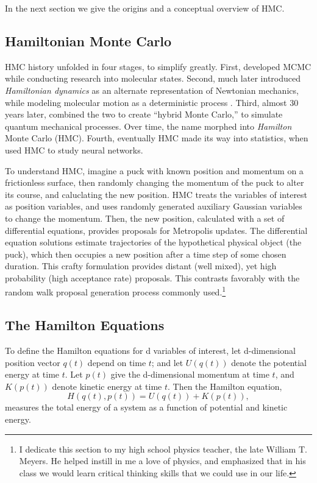 In the next section we give the origins and a conceptual overview of HMC.

\subsection{Hamiltonian Monte Carlo} 

HMC history unfolded in four stages, to simplify greatly. First, \cite{Metropolis1953} developed MCMC while conducting research into molecular states. Second, much later \cite{Alder1959} introduced {\it Hamiltonian dynamics} as an alternate representation of Newtonian mechanics, while modeling molecular motion as a deterministic process \citep{Newt}. Third, almost 30 years later, \cite{Duane1987} combined the two to create ``hybrid Monte Carlo,'' to simulate quantum mechanical processes. Over time, the name morphed into {\it Hamilton} Monte Carlo (HMC). Fourth, eventually HMC made its way into statistics, when \cite{Neal1996} used HMC to study neural networks.

To understand HMC, imagine a puck with known position and momentum on a frictionless surface, then randomly changing the momentum of the puck to alter its course, and caluclating the new position. HMC treats the variables of interest as position variables, and uses randomly generated auxiliary Gaussian variables to change the momentum. Then, the new position, calculated with a set of differential equations, provides proposals for Metropolis updates. The differential equation solutions estimate trajectories of the hypothetical physical object (the puck), which then occupies a new position after a time step of some chosen duration. This crafty formulation provides distant (well mixed), yet high probability (high acceptance rate) proposals. This contrasts favorably with the random walk proposal generation process commonly used.\footnote{I dedicate this section to my high school physics teacher, the late William T. Meyers. He helped instill in me a love of physics, and emphasized that in his class we would learn critical thinking skills that we could use in our life.}

\subsection{The Hamilton Equations} %

To define the Hamilton equations for d variables of interest, let d-dimensional position vector $q(t)$ depend on time $t$; and let $U(q(t))$ denote the potential energy at time $t$. Let $p(t)$ give the d-dimensional momentum at time $t$, and $K(p(t))$ denote kinetic energy at time $t$. Then the Hamilton equation,
\begin{equation}
H(q(t),p(t)) = U(q(t)) + K(p(t)),
\end{equation}
measures the total energy of a system as a function of potential and kinetic energy. 

